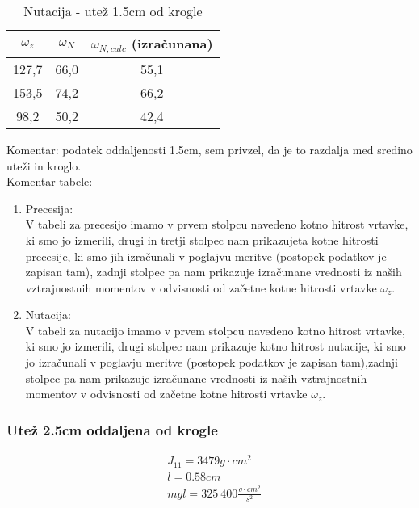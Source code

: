 \documentclass[11pt, a4paper]{article}
\theoremstyle{definition}
\theoremstyle{example}
\theoremstyle{izrek}
\begin{document}
\begin{table}[h]
	\centering
	\begin{tabular}{|c|c|c|}
		\hline
		\rule{0pt}{3ex}   
		$\omega_z$ & $\omega_{N}$ & $\omega_{N,calc}$\: (izračunana)\\
		\hline
		\hline
		127,7 &	66,0 &	55,1\\
		\hline
		153,5 &	74,2 &	66,2\\
		\hline
		98,2 &	50,2 &	42,4\\
		\hline
		
		
	\end{tabular}
	\caption{Nutacija - utež 1.5cm od krogle}
\end{table}

\vspace{2mm}
Komentar: podatek oddaljenosti 1.5cm, sem privzel, da je to razdalja med sredino uteži in kroglo.\\

Komentar tabele: 
\begin{enumerate}
\item Precesija: \\
V tabeli za precesijo imamo v prvem stolpcu navedeno  kotno hitrost vrtavke, ki smo jo izmerili, drugi in tretji stolpec nam prikazujeta kotne hitrosti precesije, ki smo jih izračunali v poglajvu meritve (postopek podatkov je zapisan tam), zadnji stolpec pa nam prikazuje izračunane vrednosti iz naših vztrajnostnih momentov v odvisnosti od začetne kotne hitrosti vrtavke $\omega_z$.
\item Nutacija: \\
V tabeli za nutacijo imamo v prvem stolpcu navedeno kotno hitrost vrtavke, ki smo jo izmerili, drugi stolpec nam prikazuje kotno hitrost nutacije, ki smo jo izračunali v poglavju meritve (postopek podatkov je zapisan tam),zadnji stolpec pa nam prikazuje izračunane vrednosti iz naših vztrajnostnih momentov v odvisnosti od začetne kotne hitrosti vrtavke $\omega_z$.
\end{enumerate}

\newpage
\subsubsection{Utež 2.5cm oddaljena od krogle}

\begin{align*}
& J_{11} = 3479g\cdot cm^2\\ 
& l = 0.58 cm\\
& mgl = 325\: 400\frac{g\cdot cm^2}{s^2}
\end{align*}
\end{document}
